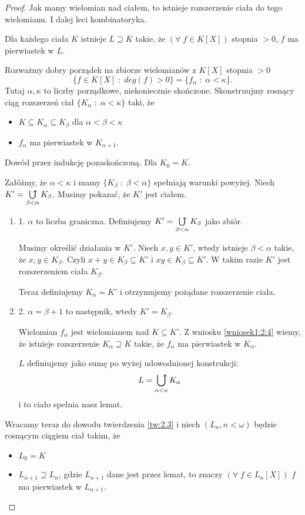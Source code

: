 \begin{proof}
Jak mamy wielomian nad ciałem, to istnieje rozszerzenie ciała do tego wielomianu. I dalej leci kombinatoryka.

 Dla każdego ciała $K$ istnieje $L\supseteq K$ takie, że $(\forall\;f\in K[X])$ stopnia $>0$, $f$ ma pierwiastek w $L$.

Rozważmy dobry porządek na zbiorze wielomianów z $K[X]$ stopnia $>0$
$$\{f\in K[X]\;:\;deg(f)>0\}=\{f_\alpha\;:\;\alpha< \kappa\}.$$
Tutaj $\alpha,\kappa$ to liczby porządkowe, niekoniecznie skończone. Skonstruujmy rosnący ciąg rozszerzeń  ciał $\{K_\alpha\;:\;\alpha< \kappa\}$ taki, że 
\begin{itemize}
\item $K\subseteq K_\alpha\subseteq K_\beta$ dla $\alpha<\beta< \kappa$
\item $f_\alpha$ ma pierwiastek w $K_{\alpha+1}$.
\end{itemize}
Dowód przez indukcję pozaskończoną. Dla $K_0=K$. 

Załóżmy, że $\alpha<\kappa$ i mamy $\{K_\beta\;:\;\beta<\alpha\}$ spełniają warunki powyżej.  Niech $K'=\abigcup\limits_{\beta<\alpha}K_\beta$. Musimy pokazać, że $K'$ jest ciałem.
\begin{enumerate}
\item 1. $\alpha$ to liczba graniczna. Definiujemy $K'=\abigcup\limits_{\beta<\alpha}K_\beta$ jako zbiór. 

Musimy określić działania w $K'$. Niech $x,y\in K'$, wtedy istnieje $\beta<\alpha$ takie, że $x,y\in K_\beta$. Czyli $x+y\in K_\beta\subseteq K'$ i $xy\in K_\beta\subseteq K'$. W takim razie $K'$ jest rozszerzeniem ciała $K_\beta$.

Teraz definiujemy $K_\alpha=K'$ i otrzymujemy pożądane rozszerzenie ciała.

\item 2. $\alpha=\beta+1$ to następnik, wtedy $K'=K_\beta$. 

Wielomian $f_\alpha$ jest wielomianem nad $K\subseteq K'$. Z wniosku \ref{wniosek1:2:4} wiemy, że istnieje rozszerzenie $K_\alpha\supseteq K$ takie, że $f_\alpha$ ma pierwiastek w $K_\alpha$.

$L$ definiujemy jako sumę po wyżej udowodnionej konstrukcji:
$$L=\abigcup\limits_{\alpha<\kappa}K_\alpha$$
i to ciało spełnia nasz lemat.
\end{enumerate}

Wracamy teraz do dowodu twierdzenia \ref{tw:2.3} i niech $(L_n,n<\omega)$ będzie rosnącym ciągiem ciał takim, że
\begin{itemize}
\item $L_0=K$
\item $L_{n+1}\supseteq L_n$, gdzie $L_{n+1}$ dane jest przez lemat, to znaczy $(\forall\;f\in L_n[X])$ $f$ ma pierwiastek w $L_{n+1}$.
\end{itemize}


\end{proof}
